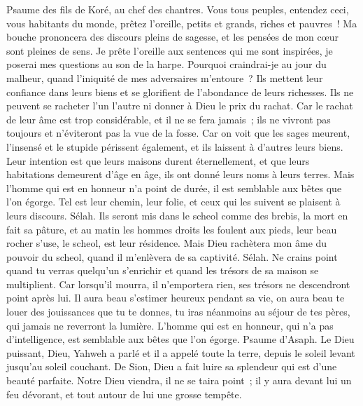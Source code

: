 \begin{multicols}{2}
\VerseOne{}Psaume des fils de Koré, au chef des chantres.
Vous tous peuples, entendez ceci, vous habitants du monde, prêtez l'oreille,
petits et grands, riches et pauvres~!
Ma bouche prononcera des discours pleins de sagesse, et les pensées de mon cœur sont pleines de sens.
Je prête l'oreille aux sentences qui me sont inspirées, je poserai mes questions au son de la harpe.
Pourquoi craindrai-je au jour du malheur, quand l'iniquité de mes adversaires m'entoure~?
Ils mettent leur confiance dans leurs biens et se glorifient de l'abondance de leurs richesses.
Ils ne peuvent se racheter l'un l'autre ni donner à Dieu le prix du rachat.
Car le rachat de leur âme est trop considérable, et il ne se fera jamais~;
ils ne vivront pas toujours et n'éviteront pas la vue de la fosse.
Car on voit que les sages meurent, l'insensé et le stupide périssent également, et ils laissent à d'autres leurs biens.
Leur intention est que leurs maisons durent éternellement, et que leurs habitations demeurent d'âge en âge, ils ont donné leurs noms à leurs terres.
Mais l'homme qui est en honneur n'a point de durée, il est semblable aux bêtes que l'on égorge.
Tel est leur chemin, leur folie, et ceux qui les suivent se plaisent à leurs discours. Sélah.
Ils seront mis dans le scheol comme des brebis, la mort en fait sa pâture, et au matin les hommes droits les foulent aux pieds, leur beau rocher s'use, le scheol, est leur résidence.
Mais Dieu rachètera mon âme du pouvoir du scheol, quand il m'enlèvera de sa captivité. Sélah.
Ne crains point quand tu verras quelqu'un s'enrichir et quand les trésors de sa maison se multiplient.
Car lorsqu'il mourra, il n'emportera rien, ses trésors ne descendront point après lui.
Il aura beau s'estimer heureux pendant sa vie, on aura beau te louer des jouissances que tu te donnes,
tu iras néanmoins au séjour de tes pères, qui jamais ne reverront la lumière.
L'homme qui est en honneur, qui n'a pas d'intelligence, est semblable aux bêtes que l'on égorge.
\VerseOne{}Psaume d'Asaph. Le Dieu puissant, Dieu, Yahweh a parlé et il a appelé toute la terre, depuis le soleil levant jusqu'au soleil couchant.
De Sion, Dieu a fait luire sa splendeur qui est d'une beauté parfaite.
Notre Dieu viendra, il ne se taira point~; il y aura devant lui un feu dévorant, et tout autour de lui une grosse tempête.

\end{multicols}
